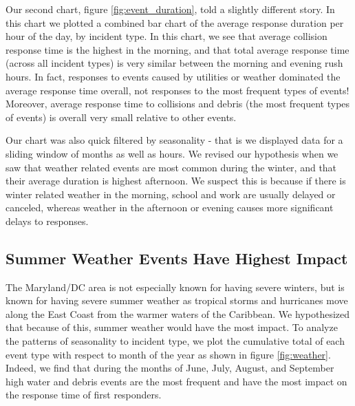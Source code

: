 \documentclass[11pt,letterpaper]{article}
\begin{document}
Our second chart, figure \ref{fig:event_duration}, told a slightly different story. In this chart we plotted a combined bar chart of the average response duration per hour of the day, by incident type. In this chart, we see that average collision response time is the highest in the morning, and that total average response time (across all incident types) is very similar between the morning and evening rush hours. In fact, responses to events caused by utilities or weather dominated the average response time overall, not responses to the most frequent types of events! Moreover, average response time to collisions and debris (the most frequent types of events) is overall very small relative to other events. 

Our chart was also quick filtered by seasonality - that is we displayed data for a sliding window of months as well as hours. We revised our hypothesis when we saw that weather related events are most common during the winter, and that their average duration is highest afternoon. We suspect this is because if there is winter related weather in the morning, school and work are usually delayed or canceled, whereas weather in the afternoon or evening causes more significant delays to responses. 

\subsection*{Summer Weather Events Have Highest Impact}

The Maryland/DC area is not especially known for having severe winters, but is known for having severe summer weather as tropical storms and hurricanes move along the East Coast from the warmer waters of the Caribbean. We hypothesized that because of this, summer weather would have the most impact. To analyze the patterns of seasonality to incident type, we plot the cumulative total of each event type with respect to month of the year as shown in figure \ref{fig:weather}. Indeed, we find that during the months of June, July, August, and September high water and debris events are the most frequent and have the most impact on the response time of first responders. 
\end{document}
